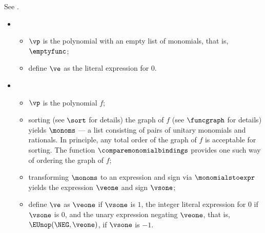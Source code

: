 \begin{mathpar}
\end{mathpar}


See .

\ProseParagraph
\OneApplies
\begin{itemize}
  \item {}
  \begin{itemize}
    \item $\vp$ is the polynomial with an empty list of monomials, that is, $\emptyfunc$;
    \item define $\ve$ as the literal expression for $0$.
  \end{itemize}

  \item {}
  \begin{itemize}
    \item $\vp$ is the polynomial $f$;
    \item sorting (see $\sort$ for details) the graph of $f$ (see $\funcgraph$ for details)
          yields $\monoms$ --- a list consisting of pairs of unitary monomials and rationals.
          In principle, any total order of the graph of $f$ is acceptable for sorting.
          The function $\comparemonomialbindings$ provides one such way of ordering
          the graph of $f$;
    \item transforming $\monoms$ to an expression and sign via $\monomialstoexpr$ yields the expression $\veone$
          and sign $\vsone$;
    \item define $\ve$ as $\veone$ if $\vsone$ is $1$, the integer literal expression for $0$ if $\vsone$ is $0$,
          and the unary expression negating $\veone$, that is,
          $\EUnop(\NEG, \veone)$, if $\vsone$ is $-1$.
  \end{itemize}
\end{itemize}

